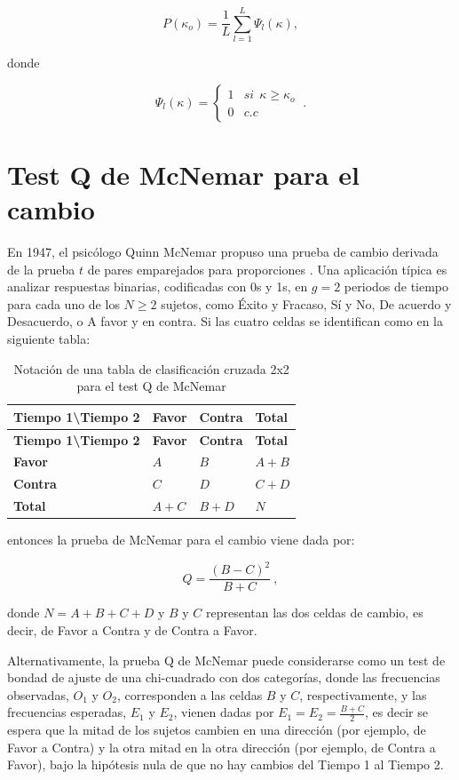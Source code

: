 \documentclass[12pt,a4paper,]{book}
\numberwithin{dummy}{section}
\theoremstyle{ocrenumbox}
\theoremstyle{blacknumex}
\theoremstyle{blacknumbox}
\theoremstyle{ocrenum}
\theoremstyle{ocrenum}
\begin{document}
\[
P(\kappa_o)=\frac{1}{L}\sum_{l=1}^L\Psi_l(\kappa),
\]

donde

\[
\Psi_l(\kappa)=\begin{cases}1 & si ~~ \kappa\ge\kappa_o\\0 & c.c\end{cases}~.
\]

\hypertarget{test-q-de-mcnemar-para-el-cambio}{%
\section{Test Q de McNemar para el
cambio}\label{test-q-de-mcnemar-para-el-cambio}}

En 1947, el psicólogo Quinn McNemar propuso una prueba de cambio
derivada de la prueba \(t\) de pares emparejados para proporciones
\citep{McNemar1947}. Una aplicación típica es analizar respuestas
binarias, codificadas con 0s y 1s, en \(g = 2\) periodos de tiempo para
cada uno de los \(N \ge 2\) sujetos, como Éxito y Fracaso, Sí y No, De
acuerdo y Desacuerdo, o A favor y en contra. Si las cuatro celdas se
identifican como en la siguiente tabla:

\begin{longtable}[]{@{}llll@{}}
\caption{Notación de una tabla de clasificación cruzada 2x2 para el test
Q de McNemar}\tabularnewline
\toprule
\textbf{Tiempo 1\textbackslash Tiempo 2} & \textbf{Favor} &
\textbf{Contra} & \textbf{Total} \\
\midrule
\endfirsthead
\toprule
\textbf{Tiempo 1\textbackslash Tiempo 2} & \textbf{Favor} &
\textbf{Contra} & \textbf{Total} \\
\midrule
\endhead
\textbf{Favor} & \(A\) & \(B\) & \(A+B\) \\
\textbf{Contra} & \(C\) & \(D\) & \(C+D\) \\
\textbf{Total} & \(A+C\) & \(B+D\) & \(N\) \\
\bottomrule
\end{longtable}

entonces la prueba de McNemar para el cambio viene dada por:

\[
Q=\frac{(B-C)^2}{B+C}~,
\]

donde \(N = A + B + C + D\) y \(B\) y \(C\) representan las dos celdas
de cambio, es decir, de Favor a Contra y de Contra a Favor.

Alternativamente, la prueba Q de McNemar puede considerarse como un test
de bondad de ajuste de una chi-cuadrado con dos categorías, donde las
frecuencias observadas, \(O_1\) y \(O_2\), corresponden a las celdas
\(B\) y \(C\), respectivamente, y las frecuencias esperadas, \(E_1\) y
\(E_2\), vienen dadas por \(E_1 = E_2 = \frac{B + C}{2}\), es decir se
espera que la mitad de los sujetos cambien en una dirección (por
ejemplo, de Favor a Contra) y la otra mitad en la otra dirección (por
ejemplo, de Contra a Favor), bajo la hipótesis nula de que no hay
cambios del Tiempo 1 al Tiempo 2.
\end{document}
